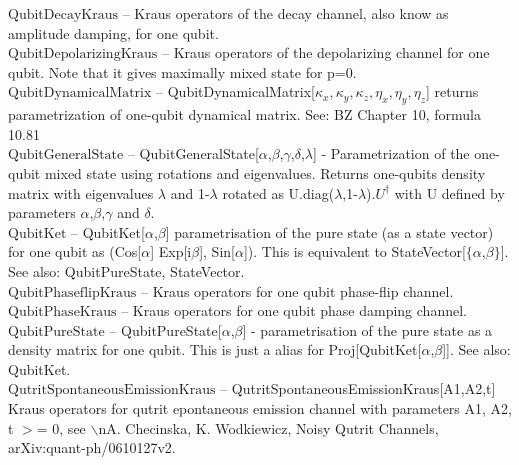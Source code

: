 \documentclass[a4paper,10pt]{scrartcl}
\begin{document}
\textbf{$ \text{QubitDecayKraus} $ }-- Kraus operators of the decay channel, also know as amplitude damping, for one qubit.$  $\\

\textbf{$ \text{QubitDepolarizingKraus} $ }-- Kraus operators of the depolarizing channel for one qubit. Note that it gives maximally mixed state for p=0.$  $\\

\textbf{$ \text{QubitDynamicalMatrix} $ }-- QubitDynamicalMatrix[$ \kappa _x,\kappa _y,\kappa _z,\eta _x,\eta _y,\eta _z $] returns parametrization of one-qubit dynamical matrix. See: BZ Chapter 10, formula 10.81$  $\\

\textbf{$ \text{QubitGeneralState} $ }-- QubitGeneralState[$\alpha $,$\beta $,$\gamma $,$\delta $,$\lambda $] - Parametrization of the one-qubit mixed state using rotations and eigenvalues. Returns one-qubits density matrix with eigenvalues $\lambda $ and 1-$\lambda $ rotated as U.diag($\lambda $,1-$\lambda $).$ U^{\dagger } $ with U defined by parameters $\alpha $,$\beta $,$\gamma $ and $\delta $.$  $\\

\textbf{$ \text{QubitKet} $ }-- QubitKet[$\alpha $,$\beta $] parametrisation of the pure state (as a state vector) for one qubit as (Cos[$\alpha $] Exp[i$\beta $], Sin[$\alpha $]). This is equivalent to StateVector[$\{\alpha $,$\beta \}$]. See also: QubitPureState, StateVector.$  $\\

\textbf{$ \text{QubitPhaseflipKraus} $ }-- Kraus operators for one qubit phase-flip channel.$  $\\

\textbf{$ \text{QubitPhaseKraus} $ }-- Kraus operators for one qubit phase damping channel.$  $\\

\textbf{$ \text{QubitPureState} $ }-- QubitPureState[$\alpha $,$\beta $] - parametrisation of the pure state as a density matrix for one qubit. This is just a alias for Proj[QubitKet[$\alpha $,$\beta $]]. See also: QubitKet.$  $\\

\textbf{$ \text{QutritSpontaneousEmissionKraus} $ }-- QutritSpontaneousEmissionKraus[A1,A2,t] Kraus operators for qutrit epontaneous emission channel with parameters A1, A2, t $>$= 0, see $\backslash $nA. Checinska, K. Wodkiewicz, Noisy Qutrit Channels, arXiv:quant-ph/0610127v2.$  $\\
\end{document}
